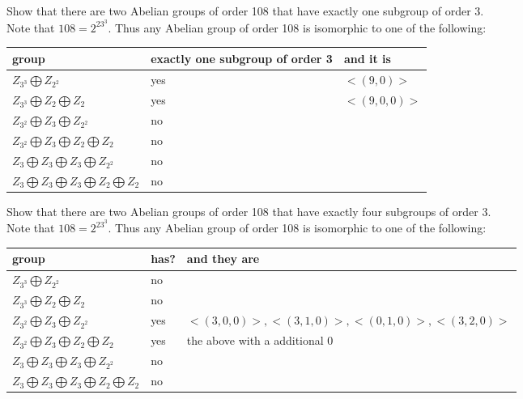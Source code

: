 \documentclass[12pt]{article}
\makeatletter
\theoremstyle{homework}
\newenvironment{exercise}[1]
{\def\@currentlabel{#1}\exercisecore}
{\endexercisecore}
\makeatother
\begin{document}
\begin{exercise}{11.6}
Show that there are two Abelian groups of order 108 that have exactly one subgroup of order 3.\\
Note that $108=2^23^3$.  Thus any Abelian group of order 108 is isomorphic to one of the following:\\
\begin{tabular}{|l|l|l|}
\hline
group & exactly one subgroup of order 3  & and it is\\
\hline
$Z_{3^3}\bigoplus Z_{2^2}$ & yes & $<(9,0)>$\\
\hline
$Z_{3^3}\bigoplus Z_{2}\bigoplus Z_2$ & yes & $<(9,0,0)>$\\
\hline
$Z_{3^2}\bigoplus Z_3\bigoplus Z_{2^2}$ & no &  \\
\hline
$Z_{3^2}\bigoplus Z_3\bigoplus Z_{2}\bigoplus Z_2$ & no &  \\
\hline
$Z_{3}\bigoplus Z_3\bigoplus Z_3\bigoplus Z_{2^2}$ & no &  \\
\hline
$Z_{3}\bigoplus Z_3\bigoplus Z_3\bigoplus Z_{2}\bigoplus Z_2$ & no &  \\
\hline
\end{tabular}
\end{exercise}

\begin{exercise}{11.7}
Show that there are two Abelian groups of order 108 that have exactly four subgroups of order 3.\\
Note that $108=2^23^3$.  Thus any Abelian group of order 108 is isomorphic to one of the following:\\
\begin{tabular}{|l|l|l|}
\hline
group & has?  & and they are\\
\hline
$Z_{3^3}\bigoplus Z_{2^2}$ & no & \\
\hline
$Z_{3^3}\bigoplus Z_{2}\bigoplus Z_2$ & no & \\
\hline
$Z_{3^2}\bigoplus Z_3\bigoplus Z_{2^2}$ & yes & $<(3,0,0)>,<(3,1,0)>,<(0,1,0)>,<(3,2,0)>$ \\
\hline
$Z_{3^2}\bigoplus Z_3\bigoplus Z_{2}\bigoplus Z_2$ & yes & the above with a additional 0 \\
\hline
$Z_{3}\bigoplus Z_3\bigoplus Z_3\bigoplus Z_{2^2}$ & no &  \\
\hline
$Z_{3}\bigoplus Z_3\bigoplus Z_3\bigoplus Z_{2}\bigoplus Z_2$ & no &  \\
\hline
\end{tabular}
\end{exercise}
\end{document}

